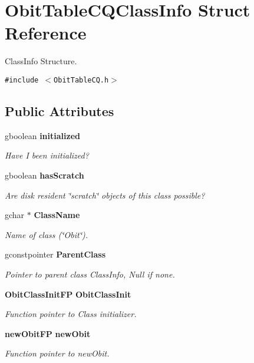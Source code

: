 \section{Obit\-Table\-CQClass\-Info Struct Reference}
\label{structObitTableCQClassInfo}
Class\-Info Structure.  


{\tt \#include $<$Obit\-Table\-CQ.h$>$}

\subsection*{Public Attributes}
\begin{CompactItemize}
\item 
gboolean {\bf initialized}
\begin{CompactList}\small\item\em Have I been initialized? \item\end{CompactList}\item 
gboolean {\bf has\-Scratch}
\begin{CompactList}\small\item\em Are disk resident \char`\"{}scratch\char`\"{} objects of this class possible? \item\end{CompactList}\item 
gchar $\ast$ {\bf Class\-Name}
\begin{CompactList}\small\item\em Name of class (\char`\"{}Obit\char`\"{}). \item\end{CompactList}\item 
gconstpointer {\bf Parent\-Class}
\begin{CompactList}\small\item\em Pointer to parent class Class\-Info, Null if none. \item\end{CompactList}\item 
{\bf Obit\-Class\-Init\-FP} {\bf Obit\-Class\-Init}
\begin{CompactList}\small\item\em Function pointer to Class initializer. \item\end{CompactList}\item 
{\bf new\-Obit\-FP} {\bf new\-Obit}
\begin{CompactList}\small\item\em Function pointer to new\-Obit. \item\end{CompactList}\item 

\end{CompactItemize}
